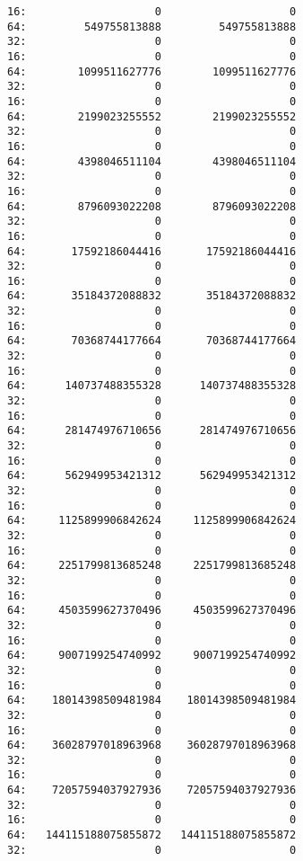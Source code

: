 \documentclass[11pt]{article}
\begin{document}
\begin{verbatim}
16:                    0                    0
64:         549755813888         549755813888
32:                    0                    0
16:                    0                    0
64:        1099511627776        1099511627776
32:                    0                    0
16:                    0                    0
64:        2199023255552        2199023255552
32:                    0                    0
16:                    0                    0
64:        4398046511104        4398046511104
32:                    0                    0
16:                    0                    0
64:        8796093022208        8796093022208
32:                    0                    0
16:                    0                    0
64:       17592186044416       17592186044416
32:                    0                    0
16:                    0                    0
64:       35184372088832       35184372088832
32:                    0                    0
16:                    0                    0
64:       70368744177664       70368744177664
32:                    0                    0
16:                    0                    0
64:      140737488355328      140737488355328
32:                    0                    0
16:                    0                    0
64:      281474976710656      281474976710656
32:                    0                    0
16:                    0                    0
64:      562949953421312      562949953421312
32:                    0                    0
16:                    0                    0
64:     1125899906842624     1125899906842624
32:                    0                    0
16:                    0                    0
64:     2251799813685248     2251799813685248
32:                    0                    0
16:                    0                    0
64:     4503599627370496     4503599627370496
32:                    0                    0
16:                    0                    0
64:     9007199254740992     9007199254740992
32:                    0                    0
16:                    0                    0
64:    18014398509481984    18014398509481984
32:                    0                    0
16:                    0                    0
64:    36028797018963968    36028797018963968
32:                    0                    0
16:                    0                    0
64:    72057594037927936    72057594037927936
32:                    0                    0
16:                    0                    0
64:   144115188075855872   144115188075855872
32:                    0                    0

\end{verbatim}
\end{document}
